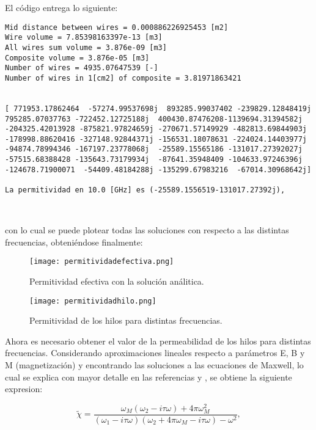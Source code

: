 \documentclass[12pt,letterpaper]{article}
\numberwithin{equation}{section}
\begin{document}
El código entrega lo siguiente:

\begin{lstlisting}
Mid distance between wires = 0.000886226925453 [m2]
Wire volume = 7.85398163397e-13 [m3]
All wires sum volume = 3.876e-09 [m3]
Composite volume = 3.876e-05 [m3]
Number of wires = 4935.07647539 [-]
Number of wires in 1[cm2] of composite = 3.81971863421


[ 771953.17862464  -57274.99537698j  893285.99037402 -239829.12848419j
795285.07037763 -722452.12725188j  400430.87476208-1139694.31394582j
-204325.42013928 -875821.97824659j -270671.57149929 -482813.69844903j
-178998.88620416 -327148.92844371j -156531.18078631 -224024.14403977j
-94874.78994346 -167197.23778068j  -25589.15565186 -131017.27392027j
-57515.68388428 -135643.73179934j  -87641.35948409 -104633.97246396j
-124678.71900071  -54409.48184288j -135299.67983216  -67014.30968642j]

La permitividad en 10.0 [GHz] es (-25589.1556519-131017.27392j),



\end{lstlisting}

\noindent con lo cual se puede plotear todas las soluciones con respecto a las distintas frecuencias, obteniéndose finalmente:

\begin{figure}[H]
	\centering\texttt{[image: permitividadefectiva.png]}\\
	\caption{Permitividad efectiva con la solución análitica.}
	\label{fig:permitividadefectiva}
\end{figure} 



\begin{figure}[H]
	\centering\texttt{[image: permitividadhilo.png]}\\
	\caption{Permitividad de los hilos para distintas frecuencias.}
	\label{fig:permitividadhilo}
\end{figure} 

Ahora es necesario obtener el valor de la permeabilidad de los hilos para distintas frecuencias. Considerando aproximaciones lineales respecto a parámetros E, B y M (magnetización) y encontrando las soluciones a las ecuaciones de Maxwell, lo cual se explica con mayor detalle en las referencias \cite{Wire_theory_2} y \cite{Wire_theory_1}, se obtiene la siguiente expresion:

\begin{equation}
	\tilde{\chi}=\frac{\omega_M(\omega_2-i\tau\omega)+4\pi\omega^2_M}{(\omega_1-i\tau\omega)(\omega_2+4\pi\omega_M-i\tau\omega)-\omega^2},
\end{equation}
\end{document}
